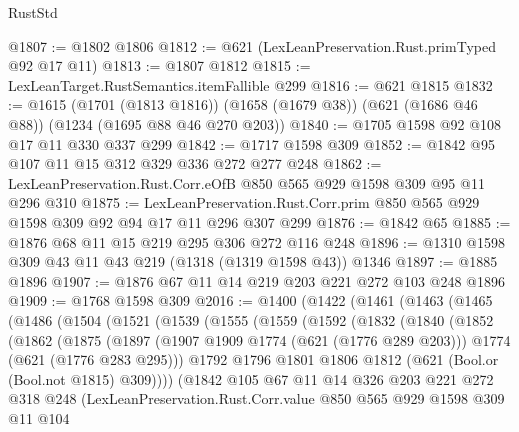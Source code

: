 \begin{lexlean}{RustStd}
\begin{coremodule}
@1807 := @1802 @1806
@1812 := @621 (LexLeanPreservation.Rust.primTyped @92 @17 @11)
@1813 := @1807 @1812
@1815 := LexLeanTarget.RustSemantics.itemFallible @299
@1816 := @621 @1815
@1832 := @1615
    (@1701 (@1813 @1816))
    (@1658 (@1679 @38))
    (@621 (@1686 @46 @88))
    (@1234 (@1695 @88 @46 @270 @203))
@1840 := @1705 @1598 @92 @108 @17 @11 @330 @337 @299
@1842 := @1717 @1598 @309
@1852 := @1842 @95 @107 @11 @15 @312 @329 @336 @272 @277 @248
@1862 := LexLeanPreservation.Rust.Corr.eOfB @850 @565 @929 @1598 @309 @95 @11 @296 @310
@1875 := LexLeanPreservation.Rust.Corr.prim @850 @565 @929 @1598 @309 @92 @94 @17 @11 @296 @307 @299
@1876 := @1842 @65
@1885 := @1876 @68 @11 @15 @219 @295 @306 @272 @116 @248
@1896 := @1310 @1598 @309 @43 @11 @43 @219 (@1318 (@1319 @1598 @43)) @1346
@1897 := @1885 @1896
@1907 := @1876 @67 @11 @14 @219 @203 @221 @272 @103 @248 @1896
@1909 := @1768 @1598 @309
@2016 := @1400
    (@1422
      (@1461
        (@1463
          (@1465
            (@1486
              (@1504
                (@1521
                  (@1539
                    (@1555
                      (@1559
                        (@1592
                          (@1832
                            (@1840
                              (@1852
                                (@1862
                                  (@1875
                                    (@1897
                                      (@1907 @1909 @1774 (@621 (@1776 @289 @203)))
                                      @1774
                                      (@621 (@1776 @283 @295)))
                                    @1792
                                    @1796
                                    @1801
                                    @1806
                                    @1812
                                    (@621 (Bool.or (Bool.not @1815) @309))))
                                (@1842
                                  @105
                                  @67
                                  @11
                                  @14
                                  @326
                                  @203
                                  @221
                                  @272
                                  @318
                                  @248
                                  (LexLeanPreservation.Rust.Corr.value
                                    @850
                                    @565
                                    @929
                                    @1598
                                    @309
                                    @11
                                    @104

\end{coremodule}
\end{lexlean}
